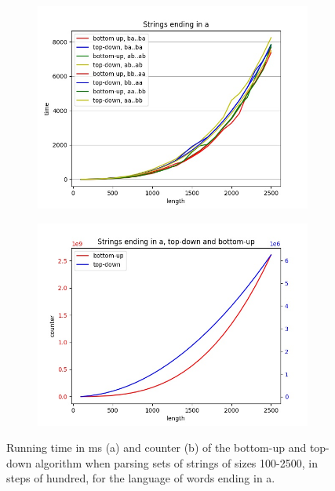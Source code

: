 \begin{figure}[!ht]
    \centering
    \begin{subfigure}[b]{0.48\textwidth}
        \includegraphics[width=1.1\textwidth]{Resources/t_ea_td_bu.jpg}
        \caption{}
        \label{fig:t_ea_td_bu}
    \end{subfigure}
    \hfill
    \begin{subfigure}[b]{0.48\textwidth}
        \includegraphics[width=1.1\textwidth]{Resources/c_ea_td_bu.jpg}
        \caption{}
        \label{fig:c_ea_td_bu}
    \end{subfigure}
    \caption{Running time in ms (a) and counter (b) of the bottom-up and top-down algorithm when parsing sets of strings of sizes 100-2500, in steps of hundred, for the language of words ending in a.}
\end{figure}

